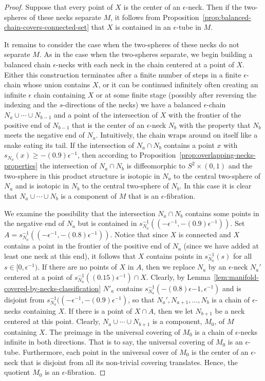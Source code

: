 \begin{proof}
 Suppose that every point of $X$ is the
center of an $\epsilon$-neck. Then if the two-spheres of these necks
separate $M$, it follows from Proposition~\ref{prop:balanced-chain-covers-connected-set} that $X$
is contained in an $\epsilon$-tube in $M$.

It remains to consider the case when the two-spheres of these necks
do not separate $M$. As in the case when the two-spheres separate,
we begin building a balanced chain $\epsilon$-necks with each neck
in the chain centered at a point of $X$. Either this construction
terminates after a finite number of steps in a finite
$\epsilon$-chain whose union contains $X$, or it can be continued
infinitely often creating an infinite $\epsilon$ chain containing
$X$ or at some finite stage (possibly after reversing the indexing
and the $s$-directions of the necks)  we have a balanced
$\epsilon$-chain $N_a\cup\cdots\cup N_{b-1}$ and a point of the
intersection of $X$ with the frontier of the positive end of
$N_{b-1}$ that is the center of an $\epsilon$-neck $N_b$ with the
property that $N_b$ meets the negative end of $N_a$. Intuitively,
the chain wraps around on itself like a snake eating its tail. If
the intersection of $N_a\cap N_b$ contains a point $x$ with
$s_{N_a}(x)\ge -(0.9)\epsilon^{-1}$, then according to
Proposition~\ref{prop:overlapping-necks-properties} the intersection of $N_a\cap N_b$
is diffeomorphic to $S^2\times (0,1)$ and the two-sphere in this
product structure is isotopic in $N_a$ to the central two-sphere of
$N_a$ and is isotopic in $N_b$ to the central two-sphere of $N_b$.
In this case it is clear that $N_a\cup \cdots \cup N_b$ is a
component of $M$ that is an $\epsilon$-fibration.

We examine the possibility that the intersection $N_a\cap N_b$
contains some points in the negative end of $N_a$ but is  contained
in $s_{N_a}^{-1}((-\epsilon^{-1},-(0.9)\epsilon^{-1}))$. Set $A=
s_{N_a}^{-1}((-\epsilon^{-1},-(0.8)\epsilon^{-1}))$. Notice that
since $X$ is connected and $X$ contains a point in the frontier of
the positive end of $N_a$ (since we have added at least one neck at
this end), it follows that $X$ contains points in $s_{N_a}^{-1}(s)$
for all $s\in [0,\epsilon^{-1})$.
 If there are
no points of $X$ in  $A$, then we replace $N_a$ by an
$\epsilon$-neck $N_a'$ centered at a point of
$s_{N_a}^{-1}\left((0.15)\epsilon^{-1}\right)\cap X$. Clearly, by
Lemma~\ref{lem:manifold-covered-by-necks-classification} $N'_a$ contains
$s_{N_a}^{-1}(-(0.8)\epsilon{-1},\epsilon^{-1})$ and is disjoint
from $s_{N_a}^{-1}((-\epsilon^{-1},-(0.9)\epsilon^{-1})$, so that
$N_a',N_{a+1}, \ldots, N_b$ is a chain of $\epsilon$-necks
containing $X$. If there is a point of $X\cap A$, then we let
$N_{b+1}$ be a neck centered at this point. Clearly,
$N_a\cup\cdots\cup N_{b+1}$ is a component, $M_0$, of $M$ containing
$X$. The preimage in the universal covering of $M_0$ is a chain of
$\epsilon$-necks infinite in both directions. That is to say, the
universal covering of $M_0$ is an $\epsilon$-tube. Furthermore, each
point in the universal cover of $M_0$ is the center of an
$\epsilon$-neck that is disjoint from all its non-trivial covering
translates. Hence, the quotient $M_0$ is an $\epsilon$-fibration.


\end{proof}

